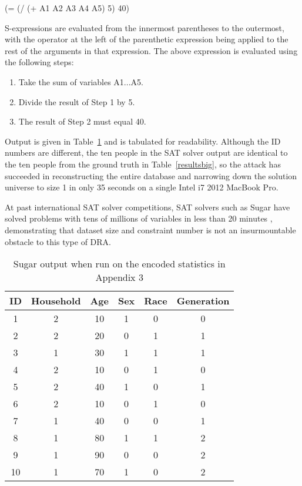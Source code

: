 \documentclass[5p,times,11pt]{elsarticle}
\begin{document}
(= (/ (+ A1 A2 A3 A4 A5) 5) 40)

S-expressions are evaluated from the innermost parentheses to the outermost, with the operator at the left of the parenthetic expression being applied to the rest of the arguments in that expression. The above expression is evaluated using the following steps:
\begin{enumerate}
    \item Take the sum of variables A1...A5.
    \item Divide the result of Step 1 by 5.
    \item The result of Step 2 must equal 40.
\end{enumerate}

Output is given in Table~\ref{sugarbig} and is tabulated for readability. Although the ID numbers are different, the ten people in the SAT solver output are identical to the ten people from the ground truth in Table~\ref{resultsbig}, so the attack has succeeded in reconstructing the entire database and narrowing down the solution universe to size 1 in only 35 seconds on a single Intel i7 2012 MacBook Pro.

At past international SAT solver competitions, SAT solvers such as Sugar have solved problems with tens of millions of variables in less than 20 minutes \cite{satcomp}, demonstrating that dataset size and constraint number is not an insurmountable obstacle to this type of DRA.

\begin{table}
\begin{tabular}{c|c|c|c|c|c}
ID & Household & Age & Sex & Race & Generation \\
\hline
1 & 2 & 10 & 1 & 0 & 0  \\
2 & 2 & 20 & 0 & 1 & 1  \\
3 & 1 & 30 & 1 & 1 & 1  \\
4 & 2 & 10 & 0 & 1 & 0  \\
5 & 2 & 40 & 1 & 0 & 1  \\
6 & 2 & 10 & 0 & 1 & 0  \\
7 & 1 & 40 & 0 & 0 & 1  \\
8 & 1 & 80 & 1 & 1 & 2  \\
9 & 1 & 90 & 0 & 0 & 2 \\
10 & 1 & 70 & 1 & 0 & 2 \\
\hline
\end{tabular}
\caption{Sugar output when run on the encoded statistics in Appendix 3}\label{sugarbig}
\end{table}
\end{document}
